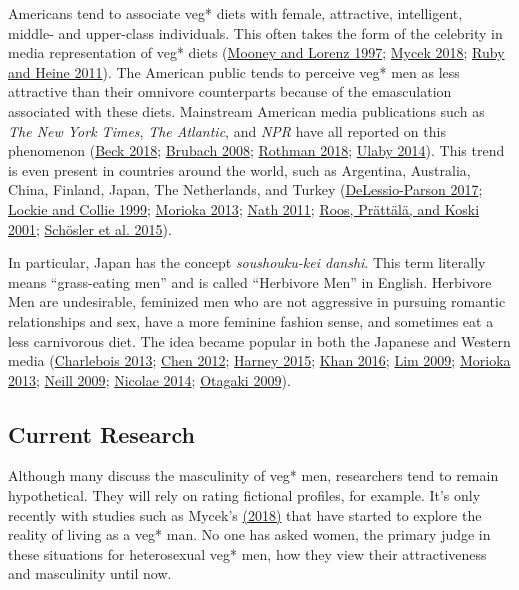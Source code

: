 \documentclass[twoside]{report}
\begin{document}
\begin{multicols}{2}
Americans tend to associate veg* diets with female, attractive,
intelligent, middle- and upper-class individuals. This often takes the
form of the celebrity in media representation of veg* diets (\hyperlink{mooney}{Mooney and
Lorenz 1997}; \hyperlink{mycek}{Mycek 2018}; \hyperlink{ruby}{Ruby and Heine 2011}). The American public
tends to perceive veg* men as less attractive than their omnivore
counterparts because of the emasculation associated with these diets.
Mainstream American media publications such as \emph{The New York
Times}, \emph{The Atlantic}, and \emph{NPR} have all reported on this
phenomenon (\hyperlink{beck}{Beck 2018}; \hyperlink{brubach}{Brubach 2008}; \hyperlink{rothman}{Rothman 2018}; \hyperlink{ulaby}{Ulaby 2014}). This trend is even present in countries around the world, such as Argentina, Australia,
China, Finland, Japan, The Netherlands, and Turkey (\hyperlink{delassio-parson}{DeLessio-Parson
2017}; \hyperlink{lockie}{Lockie and Collie 1999}; \hyperlink{morioka}{Morioka 2013}; \hyperlink{nath}{Nath 2011}; \hyperlink{roos}{Roos, Prättälä,
and Koski 2001}; \hyperlink{schosler}{Schösler et al. 2015}). 

In particular, Japan has the concept \emph{soushouku-kei danshi}. This term literally means ``grass-eating men'' and is called ``Herbivore Men'' in English. Herbivore Men are undesirable, feminized men who are not aggressive in pursuing romantic relationships and sex, have a more feminine fashion
sense, and sometimes eat a less carnivorous diet. The idea became
popular in both the Japanese and Western media (\hyperlink{charlebois}{Charlebois 2013}; \hyperlink{chen}{Chen 2012}; \hyperlink{harney}{Harney 2015}; \hyperlink{khan}{Khan 2016}; \hyperlink{lim}{Lim 2009}; \hyperlink{morioka}{Morioka 2013}; \hyperlink{neill}{Neill 2009}; \hyperlink{nicolae}{Nicolae 2014}; \hyperlink{otagaki}{Otagaki 2009}).

\subsection{Current Research}

Although many discuss the masculinity of veg* men, researchers tend to
remain hypothetical. They will rely on rating fictional profiles, for
example. It's only recently with studies such as Mycek's \hyperlink{mycek}{(2018)} that have started to explore the reality of living as a veg* man. No one has asked women, the primary judge in these situations for heterosexual veg* men, how they view their attractiveness and masculinity until now.


\end{multicols}
\end{document}
